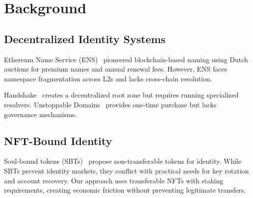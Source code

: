 \section{Background}


\subsection{Decentralized Identity Systems}

Ethereum Name Service (ENS)~\cite{ens2017} pioneered blockchain-based naming using Dutch auctions for premium names and annual renewal fees. However, ENS faces namespace fragmentation across L2s and lacks cross-chain resolution.

Handshake~\cite{handshake2018} creates a decentralized root zone but requires running specialized resolvers. Unstoppable Domains~\cite{unstoppable2019} provides one-time purchase but lacks governance mechanisms.

\subsection{NFT-Bound Identity}

Soul-bound tokens (SBTs)~\cite{sbt2022} propose non-transferable tokens for identity. While SBTs prevent identity markets, they conflict with practical needs for key rotation and account recovery. Our approach uses transferable NFTs with staking requirements, creating economic friction without preventing legitimate transfers.

